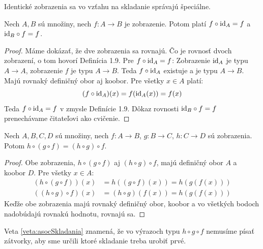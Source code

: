 Identické zobrazenia sa vo vzťahu na skladanie správajú špeciálne.
\begin{veta}\label{veta:neutralitaId}
Nech $A, B$ sú množiny, nech $f \colon A \rightarrow B$ je zobrazenie.
Potom platí $f \circ \mathrm{id}_A = f$ a $\mathrm{id}_B \circ f = f$.
\end{veta}

\begin{proof}
Máme dokázať, že dve zobrazenia sa rovnajú.
Čo je rovnosť dvoch zobrazení, o tom hovorí Definícia 1.9.
Pre $f \circ \mathrm{id}_A = f$:
Zobrazenie $\mathrm{id}_A$ je typu $A \rightarrow A$, zobrazenie $f$ je typu $A \rightarrow B$.
Teda $f \circ \mathrm{id}_A$ existuje a je typu $A \rightarrow B$. Majú rovnaký definičný obor aj koobor.
Pre všetky $x \in A$ platí:
$$ (f \circ \mathrm{id}_A)(x) = f(\mathrm{id}_A(x)) = f(x) $$
Teda $f \circ \mathrm{id}_A = f$ v zmysle Definície 1.9.
Dôkaz rovnosti $\mathrm{id}_B \circ f = f$ prenechávame čitateľovi ako cvičenie.
\end{proof}

\begin{veta}\label{veta:asocSkladania}
Nech $A, B, C, D$ sú množiny, nech $f \colon A \rightarrow B$, $g \colon B
\rightarrow C$, $h \colon C \rightarrow D$ sú zobrazenia.
Potom $h \circ (g \circ f)
= (h \circ g) \circ f$.
\end{veta}

\begin{proof}
Obe zobrazenia, $h \circ (g \circ f)$ aj $(h \circ g) \circ f$, majú definičný obor $A$ a koobor $D$.
Pre všetky $x \in A$:
\begin{align*}
    (h \circ (g \circ f))(x) &= h((g \circ f)(x)) = h(g(f(x))) \\
    ((h \circ g) \circ f)(x) &= (h \circ g)(f(x)) = h(g(f(x)))
\end{align*}
Keďže obe zobrazenia majú rovnaký definičný obor, koobor a vo všetkých bodoch nadobúdajú rovnakú hodnotu, rovnajú sa.
\end{proof}
Veta \ref{veta:asocSkladania} znamená, že vo výrazoch typu $h\circ g\circ f$ nemusíme písať zátvorky, aby sme
určili ktoré skladanie treba urobiť prvé.
